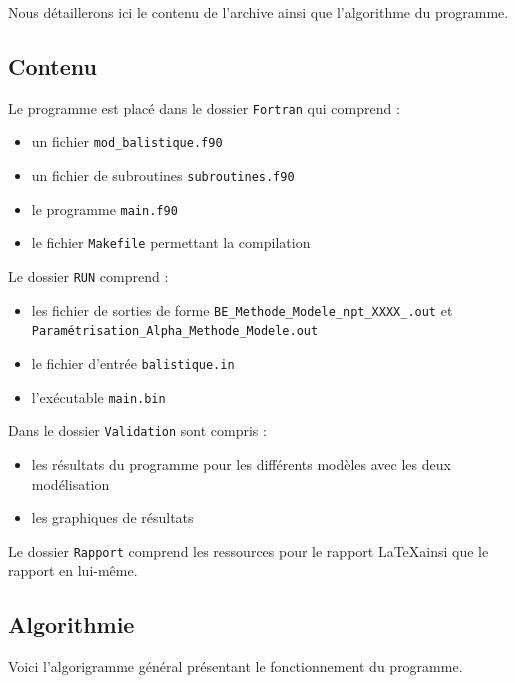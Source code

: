 \documentclass[a4paper,oneside]{article}
\begin{document}
Nous détaillerons ici le contenu de l'archive ainsi que l'algorithme du programme.

\subsection{Contenu}

Le programme est placé dans le dossier \verb?Fortran? qui comprend :

\begin{itemize}
	\item un fichier \verb?mod_balistique.f90? %
	\item un fichier de subroutines \verb?subroutines.f90?
	\item le programme \verb?main.f90?
	\item le fichier \verb?Makefile? permettant la compilation\\
	\end{itemize}

Le dossier \verb?RUN? comprend :
\begin{itemize}
	\item les fichier de sorties de forme \verb?BE_Methode_Modele_npt_XXXX_.out? et \verb? Paramétrisation_Alpha_Methode_Modele.out?
	\item le fichier d'entrée \verb?balistique.in?
	\item l'exécutable \verb?main.bin?\\
\end{itemize}

Dans le dossier \verb?Validation? sont compris :
\begin{itemize}
	\item les résultats du programme pour les différents modèles avec les deux modélisation
	\item les graphiques de résultats\\
\end{itemize}

Le dossier \verb?Rapport? comprend les ressources pour le rapport \LaTeX ainsi que le rapport en lui-même.

\subsection{Algorithmie}

Voici l'algorigramme général présentant le fonctionnement du programme.
\end{document}
